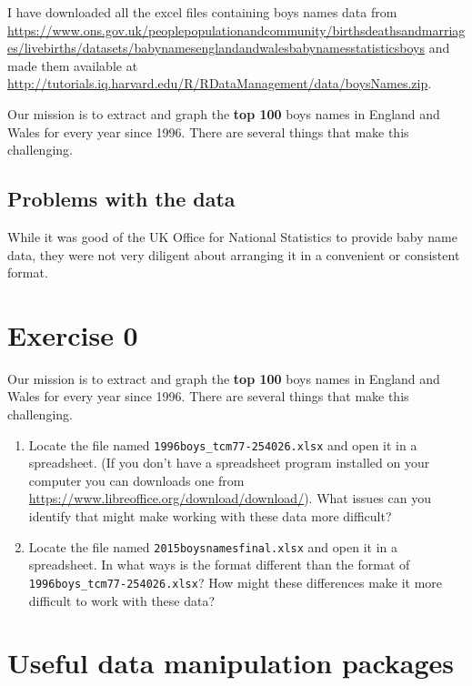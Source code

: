 \documentclass[]{book}
\begin{document}
I have downloaded all the excel files containing boys names data from
\url{https://www.ons.gov.uk/peoplepopulationandcommunity/birthsdeathsandmarriages/livebirths/datasets/babynamesenglandandwalesbabynamesstatisticsboys}
and made them available at
\url{http://tutorials.iq.harvard.edu/R/RDataManagement/data/boysNames.zip}.

Our mission is to extract and graph the \textbf{top 100} boys names in
England and Wales for every year since 1996. There are several things
that make this challenging.

\subsection{Problems with the data}\label{problems-with-the-data}

While it was good of the UK Office for National Statistics to provide
baby name data, they were not very diligent about arranging it in a
convenient or consistent format.

\section{Exercise 0}\label{exercise-0-3}

Our mission is to extract and graph the \textbf{top 100} boys names in
England and Wales for every year since 1996. There are several things
that make this challenging.

\begin{enumerate}
\def\labelenumi{\arabic{enumi}.}
\item
  Locate the file named \texttt{1996boys\_tcm77-254026.xlsx} and open it
  in a spreadsheet. (If you don't have a spreadsheet program installed
  on your computer you can downloads one from
  \url{https://www.libreoffice.org/download/download/}). What issues can
  you identify that might make working with these data more difficult?
\item
  Locate the file named \texttt{2015boysnamesfinal.xlsx} and open it in
  a spreadsheet. In what ways is the format different than the format of
  \texttt{1996boys\_tcm77-254026.xlsx}? How might these differences make
  it more difficult to work with these data?
\end{enumerate}

\section{Useful data manipulation
packages}\label{useful-data-manipulation-packages}
\end{document}
